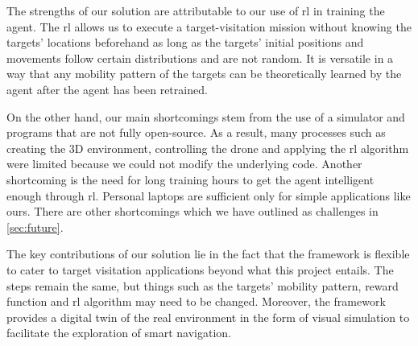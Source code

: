 \documentclass[../main.tex]{subfiles}
\begin{document}
The strengths of our solution are attributable to our use of \gls{rl} in training
the agent.
The \gls{rl} allows us to execute a target-visitation mission without
knowing the targets' locations beforehand as long as the targets'
initial positions and movements follow certain distributions and are
not random. 
It is versatile in a way that any mobility pattern of the targets can
be theoretically learned by the agent after the agent has been retrained.

On the other hand, our main shortcomings stem from the use of
a simulator and programs that are not fully open-source.
As a result, many processes such as creating the 3D environment,
controlling the drone and applying the \gls{rl} algorithm were limited
because we could not modify the underlying code.
Another shortcoming is the need for long training hours to get the
agent intelligent enough through \gls{rl}.
Personal laptops are sufficient only for simple applications like
ours.
There are other shortcomings which we have outlined as challenges in
\cref{sec:future}.

The key contributions of our solution lie in the fact that the framework
is flexible to cater to target visitation applications beyond what
this project entails.
The steps remain the same, but things such as the targets' mobility
pattern, reward function and \gls{rl} algorithm may need to be
changed.
Moreover, the framework provides a digital twin of the real
environment in the form of visual simulation to facilitate the
exploration of smart navigation.
\end{document}
